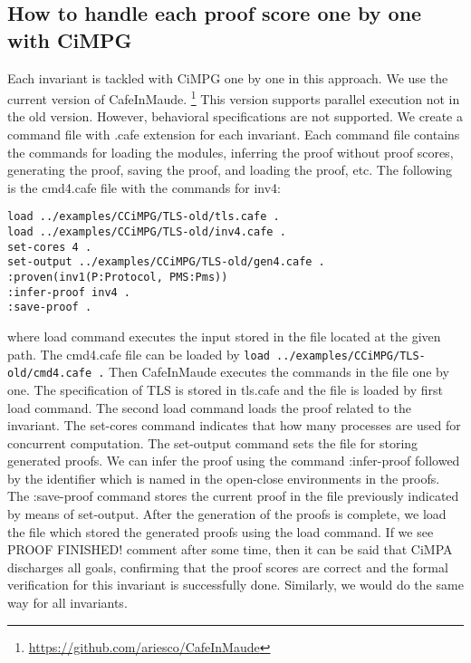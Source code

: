 \documentclass[a4paper,fleqn]{cas-dc}
\begin{document}
\subsection{How to handle each proof score one by one with CiMPG}\label{eachpf}
Each invariant is tackled with CiMPG one by one in this approach. We use the current version of CafeInMaude. \footnote{\url{https://github.com/ariesco/CafeInMaude}}
This version supports parallel execution not in the old version. However, behavioral specifications are not supported. We create a command file with .cafe extension for each invariant. Each command file contains the commands for loading the modules, inferring the proof without proof scores, generating the proof, saving the proof, and loading the proof, etc. The following is the cmd4.cafe file with the commands for inv4:
	\begin{verbatim}
load ../examples/CCiMPG/TLS-old/tls.cafe .
load ../examples/CCiMPG/TLS-old/inv4.cafe .
set-cores 4 .
set-output ../examples/CCiMPG/TLS-old/gen4.cafe .
:proven(inv1(P:Protocol, PMS:Pms))
:infer-proof inv4 .
:save-proof .
	\end{verbatim}
where load command executes the input stored in the file located at the given path. The cmd4.cafe file can be loaded by \verb!load ../examples/CCiMPG/TLS-old/cmd4.cafe .! Then CafeInMaude executes the commands in the file one by one. The specification of TLS is stored in tls.cafe and the file is loaded by first load command. The second load command loads the proof related to the invariant. The set-cores command indicates that how many processes are used for concurrent computation. The set-output command sets the file for storing generated proofs. We can infer the proof using the command :infer-proof followed by the identifier which is named in the open-close environments in the proofs. The :save-proof command stores the current proof in the file previously indicated by means of set-output. After the generation of the proofs is complete, we load the file which stored the generated proofs using the load command. If we see PROOF FINISHED! comment after some time, then it can be said that CiMPA discharges all goals, confirming that the proof scores are correct and the formal verification for this invariant is successfully done. Similarly, we would do the same way for all invariants.
	
\end{document}
